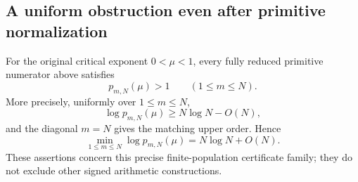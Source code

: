 \subsection{A uniform obstruction even after primitive normalization}

\begin{theorem}
\label{pop:primitive-growth}
For the original critical exponent $0<\mu<1$, every fully reduced
primitive numerator above satisfies
\[
 \boxed{p_{m,N}(\mu)>1\qquad(1\le m\le N).}
\]
More precisely, uniformly over $1\le m\le N$,
\[
 \log p_{m,N}(\mu)\ge N\log N-O(N),
\]
and the diagonal $m=N$ gives the matching upper order. Hence
\[
 \boxed{\min_{1\le m\le N}\log p_{m,N}(\mu)
             =N\log N+O(N).}
\]
These assertions concern this precise finite-population certificate
family; they do not exclude other signed arithmetic constructions.
\end{theorem}
